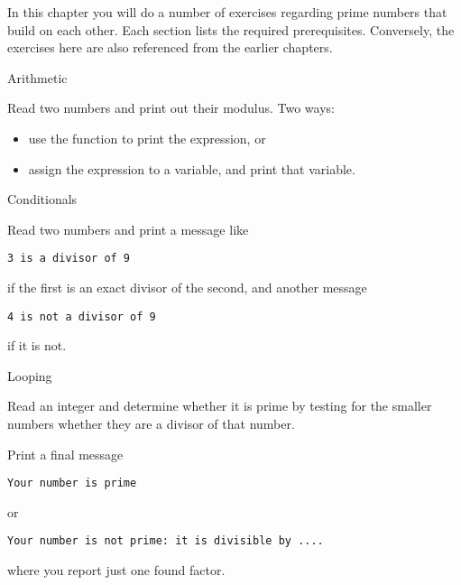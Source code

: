 
In this chapter you will do a number of exercises regarding prime
numbers that build on each other. Each section lists the required
prerequisites. Conversely, the exercises here are also referenced from
the earlier chapters.

 {Arithmetic}

\prerequisite{\ref{sec:expr}}

\begin{exercise}
  \label{ex:prime:modvar}
  Read two numbers and print out their modulus. Two ways:
  \begin{itemize}
  \item use the  function to print the expression, or
  \item assign the expression to a variable, and print that variable.
  \end{itemize}
\end{exercise}

 {Conditionals}

\prerequisite{\ref{sec:if}}

\begin{exercise}
  \label{ex:prime:divtest}
  Read two numbers and print a message like
\begin{verbatim}
3 is a divisor of 9
\end{verbatim}
  if the first is an exact
  divisor of the second, and another message
\begin{verbatim}
4 is not a divisor of 9
\end{verbatim}
if it is not.
\end{exercise}

 {Looping}

\prerequisite{\ref{sec:for}}

\begin{exercise}
  \label{ex:prime:test}
  Read an integer and determine whether it is prime by testing for the
  smaller numbers whether they are a
  divisor of that number. 

  Print a final message
\begin{verbatim}
Your number is prime
\end{verbatim}
or
\begin{verbatim}
Your number is not prime: it is divisible by ....
\end{verbatim}
where you report just one found factor.
\end{exercise}

